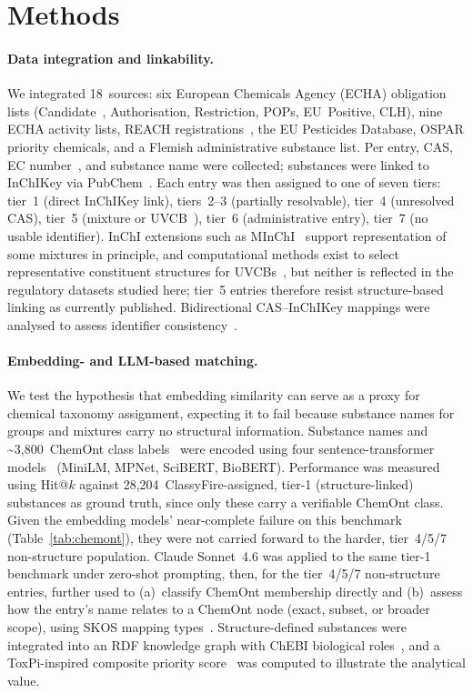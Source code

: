 \section{Methods}

\paragraph{Data integration and linkability.}
We integrated 18~sources: six European Chemicals Agency (ECHA) obligation lists (Candidate~\cite{ECHA_CandidateList}, Authorisation, Restriction, POPs, EU~Positive, CLH), nine ECHA activity lists, REACH registrations~\cite{ECHA_REACHRegistrations}, the EU Pesticides Database, OSPAR priority chemicals, and a Flemish administrative substance list.
Per entry, CAS, EC number~\cite{ECHA_EC_numbers}, and substance name were collected; substances were linked to InChIKey via PubChem~\cite{Kim2015}.
Each entry was then assigned to one of seven tiers: tier~1 (direct InChIKey link), tiers~2--3 (partially resolvable), tier~4 (unresolved CAS), tier~5 (mixture or UVCB~\cite{Kutsarova2019}), tier~6 (administrative entry), tier~7 (no usable identifier).
InChI extensions such as MInChI~\cite{Heller2015} support representation of some mixtures in principle, and computational methods exist to select representative constituent structures for UVCBs~\cite{Kutsarova2019}, but neither is reflected in the regulatory datasets studied here; tier~5 entries therefore resist structure-based linking as currently published.
Bidirectional CAS--InChIKey mappings were analysed to assess identifier consistency~\cite{Akhondi2012}.

\paragraph{Embedding- and LLM-based matching.}
We test the hypothesis that embedding similarity can serve as a proxy for chemical taxonomy assignment, expecting it to fail because substance names for groups and mixtures carry no structural information. Substance names and \textasciitilde{}3,800~ChemOnt class labels~\cite{DjoumbouFeunang2016} were encoded using four sentence-transformer models~\cite{Reimers2019} (MiniLM, MPNet, SciBERT, BioBERT).
Performance was measured using Hit@$k$ against 28,204~ClassyFire-assigned, tier-1 (structure-linked) substances as ground truth, since only these carry a verifiable ChemOnt class. Given the embedding models' near-complete failure on this benchmark (Table~\ref{tab:chemont}), they were not carried forward to the harder, tier~4/5/7 non-structure population.
Claude Sonnet~4.6 was applied to the same tier-1 benchmark under zero-shot prompting, then, for the tier~4/5/7 non-structure entries, further used to (a)~classify ChemOnt membership directly and (b)~assess how the entry's name relates to a ChemOnt node (exact, subset, or broader scope), using SKOS mapping types~\cite{W3C2009SKOS}.
Structure-defined substances were integrated into an RDF knowledge graph with ChEBI biological roles~\cite{Degtyarenko2008}, and a ToxPi-inspired composite priority score~\cite{Reif2010} was computed to illustrate the analytical value.
